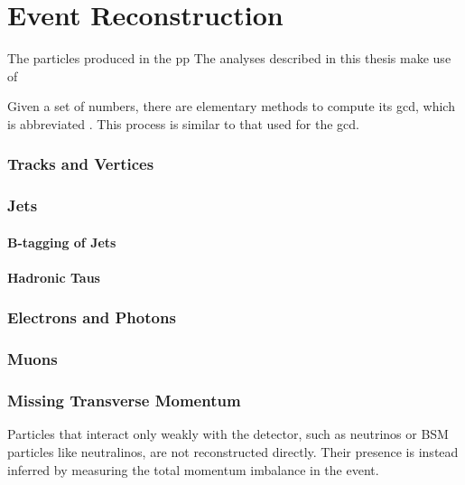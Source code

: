 \chapter{Event Reconstruction}
\label{sec:event:reco}

The particles produced in the \gls{pp}
The analyses described in this thesis make use of 

Given a set of numbers, there are elementary methods to compute 
its \acrlong{gcd}, which is abbreviated . This 
process is similar to that used for the \acrfull{gcd}.


\subsection{Tracks and Vertices}
\label{sec:reco:tracks}

\subsection{Jets}

\subsubsection{B-tagging of Jets}

\subsubsection{Hadronic Taus}

\subsection{Electrons and Photons}

\subsection{Muons}

\subsection{Missing Transverse Momentum}

Particles that interact only weakly with the detector, such as neutrinos or BSM particles like neutralinos, are not reconstructed directly. Their presence is instead inferred by measuring the total momentum imbalance in the event. 